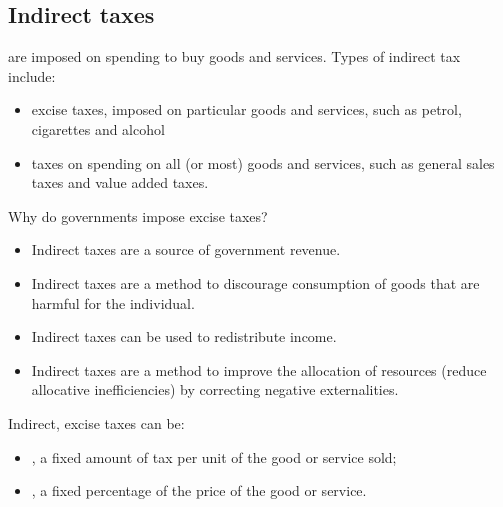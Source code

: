 \subsection{Indirect taxes}
 are imposed on spending to buy goods and services. Types of indirect tax include:
\begin{itemize}
  \item excise taxes, imposed on particular goods and services, such as petrol, cigarettes and alcohol
  \item taxes on spending on all (or most) goods and services, such as general sales taxes and value added taxes.
\end{itemize}
Why do governments impose excise taxes?
\begin{itemize}
  \item Indirect taxes are a source of government revenue.
  \item Indirect taxes are a method to discourage consumption of goods that are harmful for the individual.
  \item Indirect taxes can be used to redistribute income.
  \item Indirect taxes are a method to improve the allocation of resources (reduce allocative inefficiencies) by correcting negative externalities.
\end{itemize}
Indirect, excise taxes can be:
\begin{itemize}
  \item {}, a fixed amount of tax per unit of the good or service sold;
  \item {}, a fixed percentage of the price of the good or service.
\end{itemize}
